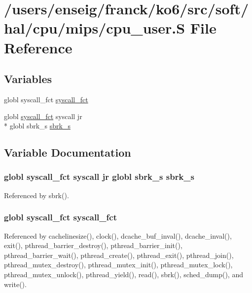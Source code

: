 \hypertarget{mips_2cpu__user_8S}{\section{/users/enseig/franck/ko6/src/soft/hal/cpu/mips/cpu\-\_\-user.S File Reference}
\label{mips_2cpu__user_8S}
}
\subsection*{Variables}
\begin{DoxyCompactItemize}
\item 
globl syscall\-\_\-fct \hyperlink{mips_2cpu__user_8S_a2824a7b580dd3afd46068b42af360fa6}{syscall\-\_\-fct}
\item 
globl \hyperlink{syscalls_8h_aace7bf799fc773070745bac1127aaaba}{syscall\-\_\-fct} syscall jr \\*
globl sbrk\-\_\-s \hyperlink{mips_2cpu__user_8S_a628c0458bf04213e82589f14f623999b}{sbrk\-\_\-s}
\end{DoxyCompactItemize}


\subsection{Variable Documentation}
\hypertarget{mips_2cpu__user_8S_a628c0458bf04213e82589f14f623999b}{
\subsubsection[{sbrk\-\_\-s}]{\setlength{\rightskip}{0pt plus 5cm}globl {\bf syscall\-\_\-fct} syscall jr globl sbrk\-\_\-s sbrk\-\_\-s}}\label{mips_2cpu__user_8S_a628c0458bf04213e82589f14f623999b}


Referenced by sbrk().

\hypertarget{mips_2cpu__user_8S_a2824a7b580dd3afd46068b42af360fa6}{
\subsubsection[{syscall\-\_\-fct}]{\setlength{\rightskip}{0pt plus 5cm}globl syscall\-\_\-fct syscall\-\_\-fct}}\label{mips_2cpu__user_8S_a2824a7b580dd3afd46068b42af360fa6}


Referenced by cachelinesize(), clock(), dcache\-\_\-buf\-\_\-inval(), dcache\-\_\-inval(), exit(), pthread\-\_\-barrier\-\_\-destroy(), pthread\-\_\-barrier\-\_\-init(), pthread\-\_\-barrier\-\_\-wait(), pthread\-\_\-create(), pthread\-\_\-exit(), pthread\-\_\-join(), pthread\-\_\-mutex\-\_\-destroy(), pthread\-\_\-mutex\-\_\-init(), pthread\-\_\-mutex\-\_\-lock(), pthread\-\_\-mutex\-\_\-unlock(), pthread\-\_\-yield(), read(), sbrk(), sched\-\_\-dump(), and write().

